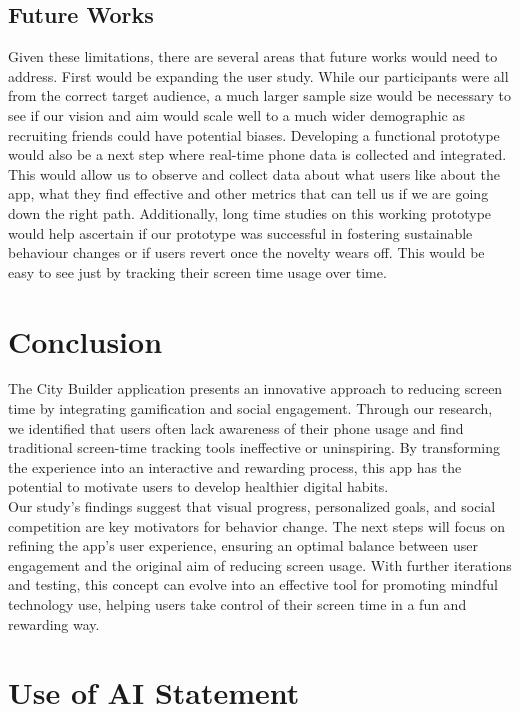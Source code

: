 \documentclass[sigconf, 11pt]{acmart}
\begin{document}
\subsection{Future Works}
Given these limitations, there are several areas that future works would need to address. First would be expanding the user study. While our participants were all from the correct target audience, a much larger sample size would be necessary to see if our vision and aim would scale well to a much wider demographic as recruiting friends could have potential biases. Developing a functional prototype would also be a next step where real-time phone data is collected and integrated. This would allow us to observe and collect data about what users like about the app, what they find effective and other metrics that can tell us if we are going down the right path. Additionally, long time studies on this working prototype would help ascertain if our prototype was successful in fostering sustainable behaviour changes or if users revert once the novelty wears off. This would be easy to see just by tracking their screen time usage over time.

\section{Conclusion}
The City Builder application presents an innovative approach to reducing screen time by integrating gamification and social engagement. Through our research, we identified that users often lack awareness of their phone usage and find traditional screen-time tracking tools ineffective or uninspiring. By transforming the experience into an interactive and rewarding process, this app has the potential to motivate users to develop healthier digital habits.
\\

Our study's findings suggest that visual progress, personalized goals, and social competition are key motivators for behavior change. The next steps will focus on refining the app’s user experience, ensuring an optimal balance between user engagement and the original aim of reducing screen usage. With further iterations and testing, this concept can evolve into an effective tool for promoting mindful technology use, helping users take control of their screen time in a fun and rewarding way.


\newpage
\section{Use of AI Statement}
\end{document}
